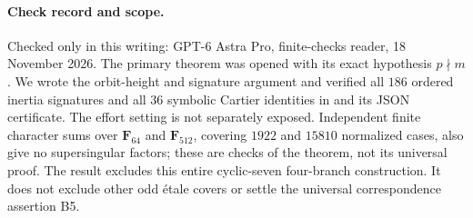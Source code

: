 \paragraph{Check record and scope.}
Checked only in this writing: GPT-6 Astra Pro, finite-checks reader,
18 November 2026. The primary theorem was opened with its exact
hypothesis $p\nmid m$. We wrote the orbit-height and signature
argument and verified all $186$ ordered inertia signatures and all
$36$ symbolic Cartier identities in
 and its JSON certificate.
The effort setting is not separately exposed. Independent finite
character sums over $\mathbf F _{64}$ and $\mathbf F _{512}$,
covering $1922$ and $15810$ normalized cases, also give no
supersingular factors; these are checks of the theorem, not its
universal proof. The result excludes this entire cyclic-seven
four-branch construction. It does not exclude other odd \'etale
covers or settle the universal correspondence assertion B5.

